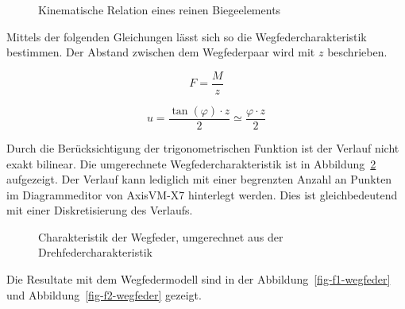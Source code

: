 \documentclass[
  11pt,
  letterpaper,
]{scrreprt}
\begin{document}
\begin{figure}[H]


\caption{\label{fig-verdrehung_verformung}Kinematische Relation eines
reinen Biegeelements}

\end{figure}%

Mittels der folgenden Gleichungen lässt sich so die
Wegfedercharakteristik bestimmen. Der Abstand zwischen dem Wegfederpaar
wird mit \(z\) beschrieben.

\[
F = \frac{M}{z}
\]

\[
u = \frac{\tan(\varphi) \cdot z}{2} \simeq \frac{\varphi \cdot z}{2}
\]

Durch die Berücksichtigung der trigonometrischen Funktion ist der
Verlauf nicht exakt bilinear. Die umgerechnete Wegfedercharakteristik
ist in Abbildung~\ref{fig-wegfeder-force} aufgezeigt. Der Verlauf kann
lediglich mit einer begrenzten Anzahl an Punkten im Diagrammeditor von
AxisVM-X7 hinterlegt werden. Dies ist gleichbedeutend mit einer
Diskretisierung des Verlaufs.

\begin{figure}[H]


\caption{\label{fig-wegfeder-force}Charakteristik der Wegfeder,
umgerechnet aus der Drehfedercharakteristik}

\end{figure}%

Die Resultate mit dem Wegfedermodell sind in der
Abbildung~\ref{fig-f1-wegfeder} und Abbildung~\ref{fig-f2-wegfeder}
gezeigt.
\end{document}
